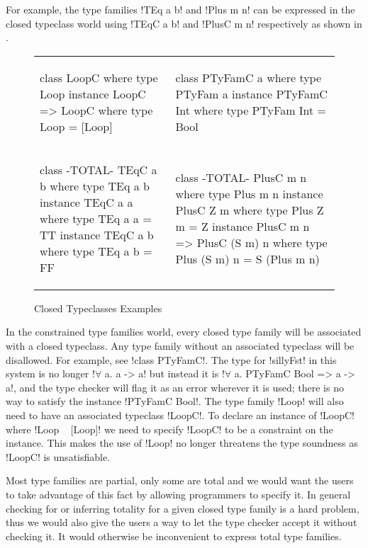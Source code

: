 \documentclass[format=acmsmall,manuscript,review,screen,nonacm,margin=1in,11pt]{acmart}
\begin{document}
For example, the type families !TEq a b! and !Plus m n! can be expressed
in the closed typeclass world using !TEqC a b! and !PlusC m n! respectively as shown in .
\begin{figure}[ht]
    \footnotesize
  \begin{tabular}{l l}
\begin{code}
class LoopC where
  type Loop
  instance LoopC => LoopC where
    type Loop = [Loop]
\end{code}&%
\begin{code}
class PTyFamC a where
  type PTyFam a
  instance PTyFamC Int where
    type PTyFam Int = Bool
\end{code}\\    
\begin{code}
class {-TOTAL-} TEqC a b where
  type TEq a b
  instance TEqC a a where
    type TEq a a = TT
  instance TEqC a b where
    type TEq a b = FF  
\end{code}&%
\begin{code}
class {-TOTAL-} PlusC m n where
  type Plus m n
  instance PlusC Z m where
    type Plus Z m = Z
  instance PlusC m n => PlusC (S m) n where
    type Plus (S m) n = S (Plus m n)  
\end{code}
  \end{tabular}
  \caption{Closed Typeclasses Examples}
  \label{fig:closed-tc-examples}
\end{figure}
In the constrained type families world, every closed type family will be associated with
a closed typeclass. Any type family without an associated typeclass will be disallowed.
For example, see !class PTyFamC!. The type for !sillyFst! in this system is no longer
!$\forall$ a. a -> a! but instead it is !$\forall$ a. PTyFamC Bool => a -> a!, and the type
checker will flag it as an error wherever it is used; there is no way to satisfy
the instance !PTyFamC Bool!. The type family !Loop! will also need to have
an associated typeclass !LoopC!. To declare an instance of !LoopC!
where !Loop ~ [Loop]! we need to specify !LoopC! to be a constraint on the instance.
This makes the use of !Loop! no longer threatens the type soundness as !LoopC! is unsatisfiable.

Most type families are partial, only some are total and we would want
the users to take advantage of this fact by allowing programmers to specify it.
In general checking for or inferring totality for a given closed type family is a hard problem, thus
we would also give the users a way to let the type checker accept it without checking it.
It would otherwise be inconvenient to express total type families. 
\end{document}
